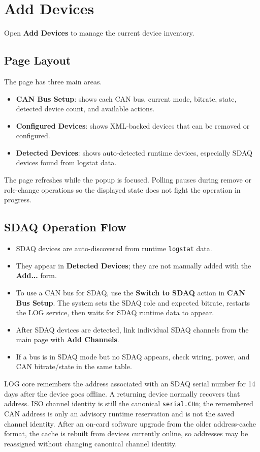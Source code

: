 \documentclass[11pt,a4paper]{article}
\begin{document}
\section{Add Devices}
Open \textbf{Add Devices} to manage the current device inventory.

\subsection{Page Layout}
The page has three main areas.

\begin{itemize}
\item \textbf{CAN Bus Setup}: shows each CAN bus, current mode, bitrate, state, detected device count, and available actions.
\item \textbf{Configured Devices}: shows XML-backed devices that can be removed or configured.
\item \textbf{Detected Devices}: shows auto-detected runtime devices, especially SDAQ devices found from logstat data.
\end{itemize}

The page refreshes while the popup is focused. Polling pauses during remove or role-change operations so the displayed state does not fight the operation in progress.

\subsection{SDAQ Operation Flow}
\begin{itemize}
\item SDAQ devices are auto-discovered from runtime \texttt{logstat} data.
\item They appear in \textbf{Detected Devices}; they are not manually added with the \textbf{Add...} form.
\item To use a CAN bus for SDAQ, use the \textbf{Switch to SDAQ} action in \textbf{CAN Bus Setup}. The system sets the SDAQ role and expected bitrate, restarts the LOG service, then waits for SDAQ runtime data to appear.
\item After SDAQ devices are detected, link individual SDAQ channels from the main page with \textbf{Add Channels}.
\item If a bus is in SDAQ mode but no SDAQ appears, check wiring, power, and CAN bitrate/state in the same table.
\end{itemize}

LOG core remembers the address associated with an SDAQ serial number for 14 days after the device goes offline. A returning device normally recovers that address. ISO channel identity is still the canonical \texttt{serial.CHn}; the remembered CAN address is only an advisory runtime reservation and is not the saved channel identity. After an on-card software upgrade from the older address-cache format, the cache is rebuilt from devices currently online, so addresses may be reassigned without changing canonical channel identity.
\end{document}
